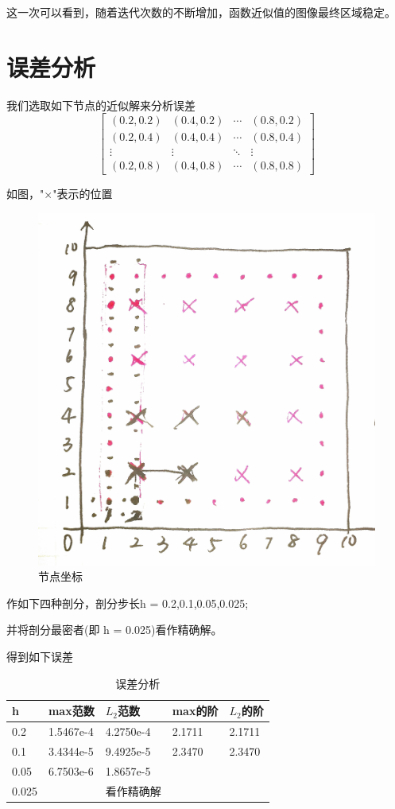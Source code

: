 \documentclass[12pt,a4paper]{article}
\begin{document}
这一次可以看到，随着迭代次数的不断增加，函数近似值的图像最终区域稳定。
\newpage
\section{误差分析}
我们选取如下节点的近似解来分析误差
\begin{equation}
\left[                 
\begin{array}{cccc}
(0.2,0.2)& (0.4,0.2) &\cdots  & (0.8,0.2)\\
(0.2,0.4)& (0.4,0.4) &\cdots& (0.8,0.4)\\
\vdots  & \vdots & \ddots & \vdots \\
(0.2,0.8)& (0.4,0.8) &\cdots  &(0.8,0.8)
\end{array}
\right]
\end{equation}

如图，"$\times$"表示的位置
\begin{figure}[ht]
	\centering
	\includegraphics[scale=0.1]{./figures/jiedian.jpg}
	\caption{节点坐标}
	\label{fig:label}	
\end{figure}

作如下四种剖分，剖分步长h = 0.2,0.1,0.05,0.025;

并将剖分最密者(即 h = 0.025)看作精确解。

得到如下误差
\begin{table}
	\centering  
	\caption{误差分析}  
	\begin{tabular*}{12cm}{lllll}  
		\hline  
		h & max范数  & $L_2$范数 &max的阶& $L_2$的阶\\  
		\hline  
		0.2  & 1.5467e-4 & 4.2750e-4 & 2.1711 & 2.1711\\  
		0.1  & 3.4344e-5 & 9.4925e-5 & 2.3470 & 2.3470\\
		0.05  & 6.7503e-6 & 1.8657e-5& \ & \ \\
		0.025  &   &看作精确解   & & \\  
		\hline  
	\end{tabular*}  
\end{table}
\end{document}
